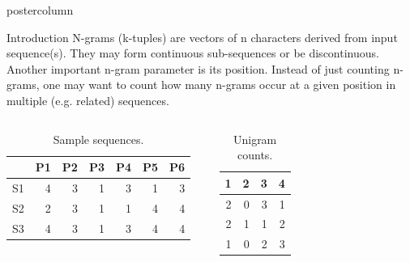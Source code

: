 \documentclass[final]{beamer}\usepackage[]{graphicx}\usepackage[]{color}
\newlength{\columnheight}
\begin{document}
\begin{frame}
  \begin{columns}
    \begin{column}{.49\textwidth}
      \begin{beamercolorbox}[center,wd=\textwidth]{postercolumn}
        \begin{minipage}[T]{.95\textwidth}
          \parbox[t][\columnheight]{\textwidth}
            {
    
        
    \begin{block}{Introduction}
      N-grams (k-tuples) are vectors of n characters derived from input sequence(s). They may form continuous sub-sequences or be discontinuous. Another important n-gram parameter is its position. Instead of just counting n-grams, one may want to count how many n-grams occur at a given position in multiple (e.g. related) sequences.

\small{
       \begin{columns}[c] %
\begin{table}[ht]
\centering
\begin{tabular}{rrrrrrr}
  \hline
 & P1 & P2 & P3 & P4 & P5 & P6 \\ 
  \hline
S1 & 4 & 3 & 1 & 3 & 1 & 3 \\ 
  S2 & 2 & 3 & 1 & 1 & 4 & 4 \\ 
  S3 & 4 & 3 & 1 & 3 & 4 & 4 \\ 
   \hline
\end{tabular}
\caption{Sample sequences.} 
\end{table}

      
      

    
\begin{table}[ht]
\centering
\begin{tabular}{rrrr}
  \hline
1 & 2 & 3 & 4 \\ 
  \hline
2 & 0 & 3 & 1 \\ 
  2 & 1 & 1 & 2 \\ 
  1 & 0 & 2 & 3 \\ 
   \hline
\end{tabular}
\caption{Unigram counts.} 
\end{table}



\end{columns}}
\end{block}}
\end{minipage}
\end{beamercolorbox}
\end{column}
\end{columns}
\end{frame}
\end{document}
